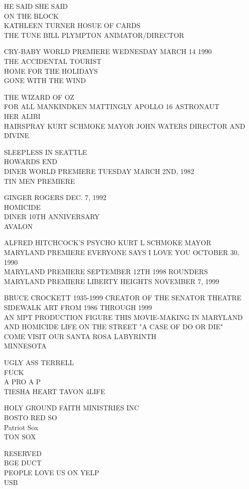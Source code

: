 \documentclass[10pt,letterpaper]{article}
\begin{document}
HE SAID SHE SAID\\
ON THE BLOCK\\
KATHLEEN TURNER HOSUE OF CARDS\\
THE TUNE BILL PLYMPTON ANIMATOR/DIRECTOR

CRY{-}BABY WORLD PREMIERE WEDNESDAY MARCH 14 1990\\
THE ACCIDENTAL TOURIST\\
HOME FOR THE HOLIDAYS\\
GONE WITH THE WIND

THE WIZARD OF OZ\\
FOR ALL MANKINDKEN MATTINGLY APOLLO 16 ASTRONAUT\\
HER ALIBI\\
HAIRSPRAY KURT SCHMOKE MAYOR JOHN WATERS DIRECTOR AND DIVINE

SLEEPLESS IN SEATTLE\\
HOWARDS END\\
DINER WORLD PREMIERE TUESDAY MARCH 2ND, 1982\\
TIN MEN PREMIERE

GINGER ROGERS DEC. 7, 1992\\
HOMICIDE\\
DINER 10TH ANNIVERSARY\\
AVALON

ALFRED HITCHCOCK'S PSYCHO KURT L SCHMOKE MAYOR\\
MARYLAND PREMIERE EVERYONE SAYS I LOVE YOU OCTOBER 30, 1990\\
MARYLAND PREMIERE SEPTEMBER 12TH 1998 ROUNDERS\\
MARYLAND PREMIERE LIBERTY HEIGHTS NOVEMBER 7, 1999

BRUCE CROCKETT 1935{-}1999 CREATOR OF THE SENATOR THEATRE SIDEWALK ART FROM 1986 THROUGH 1999\\
AN MPT PRODUCTION FIGURE THIS MOVIE{-}MAKING IN MARYLAND AND HOMICIDE LIFE ON THE STREET "A CASE OF DO OR DIE"\\
COME VISIT OUR SANTA ROSA LABYRINTH\\
MINNESOTA

UGLY ASS TERRELL\\
FUCK\\
A PRO A P\\
TIESHA HEART TAVON 4LIFE

HOLY GROUND FAITH MINISTRIES INC\\
BOSTO RED SO\\
Patriot Sox\\
TON SOX

RESERVED\\
BGE DUCT\\
PEOPLE LOVE US ON YELP\\
USB
\end{document}
